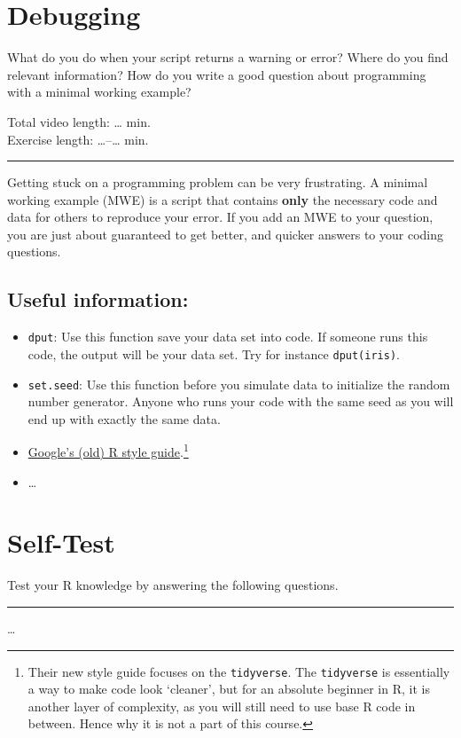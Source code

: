 \documentclass[
]{book}
\providecommand{\tightlist}{%
  \setlength{\itemsep}{0pt}\setlength{\parskip}{0pt}}
\begin{document}
\hypertarget{MWE}{%
\chapter{Debugging}\label{MWE}}

What do you do when your script returns a warning or error? Where do you find relevant information? How do you write a good question about programming with a minimal working example?

Total video length: \ldots{} min.\\
Exercise length: \ldots--\ldots{} min.

\begin{center}\rule{0.5\linewidth}{0.5pt}\end{center}

Getting stuck on a programming problem can be very frustrating. A minimal working example (MWE) is a script that contains \textbf{only} the necessary code and data for others to reproduce your error. If you add an MWE to your question, you are just about guaranteed to get better, and quicker answers to your coding questions.

\hypertarget{useful-information}{%
\section{Useful information:}\label{useful-information}}

\begin{itemize}
\tightlist
\item
  \texttt{dput}: Use this function save your data set into code. If someone runs this code, the output will be your data set. Try for instance \texttt{dput(iris)}.
\item
  \texttt{set.seed}: Use this function before you simulate data to initialize the random number generator. Anyone who runs your code with the same seed as you will end up with exactly the same data.
\item
  \href{http://web.stanford.edu/class/cs109l/unrestricted/resources/google-style.html}{Google's (old) R style guide}.\footnote{Their new style guide focuses on the \texttt{tidyverse}. The \texttt{tidyverse} is essentially a way to make code look `cleaner', but for an absolute beginner in R, it is another layer of complexity, as you will still need to use base R code in between. Hence why it is not a part of this course.}
\item
  \ldots{}
\end{itemize}

\hypertarget{self-test}{%
\chapter*{Self-Test}\label{self-test}}

Test your R knowledge by answering the following questions.

\begin{center}\rule{0.5\linewidth}{0.5pt}\end{center}

\ldots{}
\end{document}
